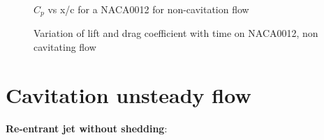  \begin{figure}[H]
    \centering
    \qquad
   \qquad
      \caption{$C_p$ vs x/c for a NACA0012 for non-cavitation flow}
    \label{fig:fig16}
\end{figure} 
   
  \begin{figure}[H]
    \centering
    \qquad
   \qquad
      \caption{Variation of lift and drag coefficient with time on NACA0012, non cavitating flow}
    \label{fig:fig16}
\end{figure} 
\section{Cavitation unsteady flow}
\textbf{Re-entrant jet without shedding}:
  

